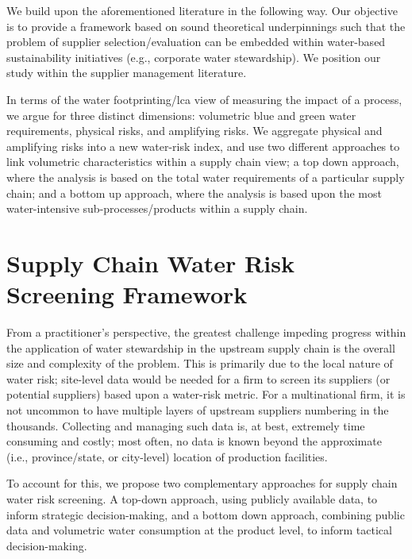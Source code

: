 \documentclass[a4paper]{article}
\begin{document}
We build upon the aforementioned literature in the following way. 
Our objective is to provide a framework based on sound theoretical underpinnings such that the problem of supplier selection/evaluation can be embedded within water-based sustainability initiatives (e.g., corporate water stewardship). 
We position our study within the supplier management literature. 

In terms of the water footprinting/lca view of measuring the impact of a process, we argue for three distinct dimensions: volumetric blue and green water requirements, physical risks, and amplifying risks. 
We aggregate physical and amplifying risks into a new water-risk index, and use two different approaches to link volumetric characteristics within a supply chain view; a top down approach, where the analysis is based on the total water requirements of a particular supply chain; and a bottom up approach, where the analysis is based upon the most water-intensive sub-processes/products within a supply chain.
 



\section{Supply Chain Water Risk Screening Framework}
From a practitioner’s perspective, the greatest challenge impeding progress within the application of water stewardship in the upstream supply chain is the overall size and complexity of the problem.
This is primarily due to the local nature of water risk; site-level data would be needed for a firm to screen its suppliers (or potential suppliers) based upon a water-risk metric.
For a multinational firm, it is not uncommon to have multiple layers of upstream suppliers numbering in the thousands. 
Collecting and managing such data is, at best, extremely time consuming and costly; most often, no data is known beyond the approximate (i.e., province/state, or city-level) location of production facilities.

To account for this, we propose two complementary approaches for supply chain water risk screening. 
A top-down approach, using publicly available data, to inform strategic decision-making, and a bottom down approach, combining public data and volumetric water consumption at the product level, to inform tactical decision-making.
\end{document}
